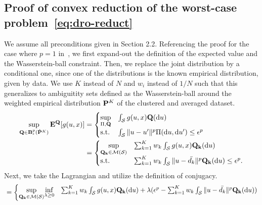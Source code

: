 \documentclass[12pt]{article}
\theoremstyle{thmstyleone}%
\theoremstyle{thmstyletwo}%
\theoremstyle{thmstylethree}%
\newcommand{\reviewChanges}{}
\begin{document}
\begin{appendices}
\section{Proof of convex reduction of the worst-case problem~\eqref{eq:dro-reduct}}
\fi
\label{app:convex_red}
We assume all preconditions given in Section 2.2. Referencing the proof for the case where $p=1$ in~\cite{mohajerin_esfahani_data-driven_2018}, we first expand-out the definition of the expected value and the Wasserstein-ball constraint. Then, we replace the joint distribution by a conditional one, since one of the distributions is the known empirical distribution, given by data. We use $K$ instead of $N$ and $w_i$ instead of $1/N$ such that this generalizes to ambiguitity sets defined as the Wasserstein-ball around the weighted empirical distribution ${\mathbf P}^K$ of the clustered and averaged dataset.
\begin{equation*}
\begin{aligned}
  \sup_{\mathbf{Q}\in \mathbf{B}_\epsilon^p(\hat{\prob}^K)} \Expect^\mathbf{Q}[g(u,x)] &=
    \begin{cases}
      \underset{\Pi, \mathbf{Q}}{\sup} & \int_\reviewChanges{\supp} g(u,x)\mathbf{Q}(\dif u)\\
			\text{s.t.} & \int_\reviewChanges{\supp} \|u - u'\|^p \Pi (\dif u,\dif u') \leq \epsilon^p
    \end{cases} \\
		&=   \begin{cases}
      \underset{\mathbf{Q_k} \in \mathcal{M}(\supp)}{\sup} & \sum_{k = 1}^K w_k \int_\reviewChanges{\supp} g(u,x)\mathbf{Q_k}(\dif u)\\
			\text{s.t.} &  \sum_{k = 1}^K w_k \int_\reviewChanges{\supp} \|u - \bar{d_k}\|^p \mathbf{Q_k}(\dif u) \leq \epsilon^p.
    \end{cases} \\
\end{aligned}
\end{equation*}
Next, we take the Lagrangian and utilize the definition of conjugacy.
\begin{equation*}
\begin{aligned}
		&= \begin{cases}
			\underset{\mathbf{Q_k} \in \mathcal{M}(\supp)}{\sup}\underset{\lambda \geq 0}{\inf} &  \sum_{k = 1}^K w_k \int_\reviewChanges{\supp} g(u,x)\mathbf{Q_k}(\dif u) + \lambda(\epsilon^p - \sum_{k = 1}^K w_k \int_\reviewChanges{\supp} \|u - \bar{d_k}\|^p \mathbf{Q_k}(\dif u) )\\
	\end{cases}\\

\end{aligned}
\end{equation*}
\end{appendices}
\end{document}
